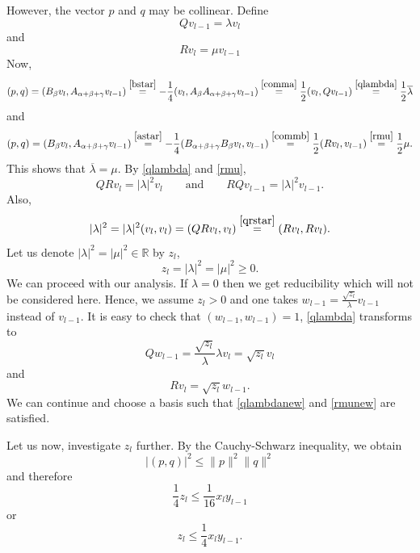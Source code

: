 \documentclass[twoside,a4paper,12pt]{article}
\newcommand{\R}{\ensuremath{\mathbb R}}
\theoremstyle{definition}
\begin{document}
However, the vector $p$ and $q$ may be collinear.
Define
\begin{equation}\label{qlambda}
	Qv_{l-1}=\lambda v_l
\end{equation}
and
\begin{equation}\label{rmu}
	Rv_l=\mu v_{l-1}
\end{equation}
Now,
\begin{equation*}
	(p,q)=(B_\beta v_l,A_{\alpha+\beta+\gamma}v_{l-1})
	\stackrel{\eqref{bstar}}{=}
	-\frac14(v_l,A_\beta A_{\alpha+\beta+\gamma}v_{l-1})
	\stackrel{\eqref{comma}}{=}
	\frac12(v_l,Qv_{l-1})
	\stackrel{\eqref{qlambda}}{=}
	\frac12\overline{\lambda}
\end{equation*}
and
\begin{equation*}
	(p,q)=(B_\beta v_l,A_{\alpha+\beta+\gamma}v_{l-1})
	\stackrel{\eqref{astar}}{=}
	-\frac14(B_{\alpha+\beta+\gamma}B_\beta v_l,v_{l-1})
	\stackrel{\eqref{commb}}{=}
	\frac12(Rv_l,v_{l-1})
	\stackrel{\eqref{rmu}}{=}
	\frac12\mu.
\end{equation*}
This shows that $\overline{\lambda}=\mu$. By \eqref{qlambda} and \eqref{rmu},
\begin{equation*}
	QRv_l=|\lambda|^2v_l\qquad\mbox{and}\qquad RQv_{l-1}=|\lambda|^2v_{l-1}.
\end{equation*}
Also,
\begin{equation*}
	|\lambda|^2=|\lambda|^2(v_l,v_l)=(QRv_l,v_l)\stackrel{\eqref{qrstar}}{=}
	(Rv_l,Rv_l).
\end{equation*}
Let us denote $|\lambda|^2=|\mu|^2\in\R$ by $z_l$,
\begin{equation*}
	z_l=|\lambda|^2=|\mu|^2\geq0.
\end{equation*}
We can proceed with our analysis.
If $\lambda=0$ then we get reducibility which will not be considered here.
Hence, we assume $z_l>0$ and
one takes $w_{l-1}=\frac{\sqrt{z_l}}{\lambda}v_{l-1}$ instead of
$v_{l-1}$. It is easy to check that $(w_{l-1},w_{l-1})=1$,
\eqref{qlambda} transforms to
\begin{equation}\label{qlambdanew}
	Qw_{l-1}=\frac{\sqrt{z_l}}{\lambda}\lambda v_l=\sqrt{z_l}v_l
\end{equation}
and
\begin{equation}\label{rmunew}
	Rv_l=\sqrt{z_l}w_{l-1}.
\end{equation}
We can continue and choose a basis such that \eqref{qlambdanew} and
\eqref{rmunew} are satisfied.

Let us now, investigate $z_l$ further.
By the Cauchy-Schwarz inequality, we obtain
\begin{equation*}
	|(p,q)|^2\leq\|p\|^2\|q\|^2
\end{equation*}
and therefore
\begin{equation*}
	\frac14z_l\leq\frac1{16}x_ly_{l-1}
\end{equation*}
or
\begin{equation*}
	z_l\leq\frac14x_ly_{l-1}.
\end{equation*}
\end{document}
